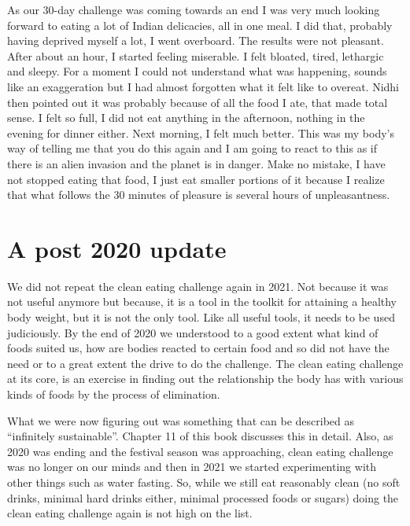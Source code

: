 \documentclass[
  oneside]{book}
\begin{document}
As our 30-day challenge was coming towards an end I was very much looking forward to eating a lot of Indian delicacies, all in one meal. I did that, probably having deprived myself a lot, I went overboard. The results were not pleasant. After about an hour, I started feeling miserable. I felt bloated, tired, lethargic and sleepy. For a moment I could not understand what was happening, sounds like an exaggeration but I had almost forgotten what it felt like to overeat. Nidhi then pointed out it was probably because of all the food I ate, that made total sense. I felt so full, I did not eat anything in the afternoon, nothing in the evening for dinner either. Next morning, I felt much better. This was my body's way of telling me that you do this again and I am going to react to this as if there is an alien invasion and the planet is in danger. Make no mistake, I have not stopped eating that food, I just eat smaller portions of it because I realize that what follows the 30 minutes of pleasure is several hours of unpleasantness.

\hypertarget{a-post-2020-update}{%
\section{A post 2020 update}\label{a-post-2020-update}}

We did not repeat the clean eating challenge again in 2021. Not because it was not useful anymore but because, it is a tool in the toolkit for attaining a healthy body weight, but it is not the only tool. Like all useful tools, it needs to be used judiciously. By the end of 2020 we understood to a good extent what kind of foods suited us, how are bodies reacted to certain food and so did not have the need or to a great extent the drive to do the challenge. The clean eating challenge at its core, is an exercise in finding out the relationship the body has with various kinds of foods by the process of elimination.

What we were now figuring out was something that can be described as ``infinitely sustainable''. Chapter 11 of this book discusses this in detail. Also, as 2020 was ending and the festival season was approaching, clean eating challenge was no longer on our minds and then in 2021 we started experimenting with other things such as water fasting. So, while we still eat reasonably clean (no soft drinks, minimal hard drinks either, minimal processed foods or sugars) doing the clean eating challenge again is not high on the list.
\end{document}

